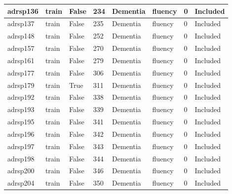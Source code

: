 \begin{center}
\begin{longtable}{|l|l|l|l|l|l|l|l|}
adrsp136       & train                 & False             & 234     & Dementia       & fluency         & 0            & Included      \\ \hline
adrsp137       & train                 & False             & 235     & Dementia       & fluency         & 0            & Included      \\ \hline
adrsp148       & train                 & False             & 252     & Dementia       & fluency         & 0            & Included      \\ \hline
adrsp157       & train                 & False             & 270     & Dementia       & fluency         & 0            & Included      \\ \hline
adrsp161       & train                 & False             & 279     & Dementia       & fluency         & 0            & Included      \\ \hline
adrsp177       & train                 & False             & 306     & Dementia       & fluency         & 0            & Included      \\ \hline
adrsp179       & train                 & True              & 311     & Dementia       & fluency         & 0            & Included      \\ \hline
adrsp192       & train                 & False             & 338     & Dementia       & fluency         & 0            & Included      \\ \hline
adrsp193       & train                 & False             & 339     & Dementia       & fluency         & 0            & Included      \\ \hline
adrsp195       & train                 & False             & 341     & Dementia       & fluency         & 0            & Included      \\ \hline
adrsp196       & train                 & False             & 342     & Dementia       & fluency         & 0            & Included      \\ \hline
adrsp197       & train                 & False             & 343     & Dementia       & fluency         & 0            & Included      \\ \hline
adrsp198       & train                 & False             & 344     & Dementia       & fluency         & 0            & Included      \\ \hline
adrsp200       & train                 & False             & 346     & Dementia       & fluency         & 0            & Included      \\ \hline
adrsp204       & train                 & False             & 350     & Dementia       & fluency         & 0            & Included      \\ \hline

\end{longtable}
\end{center}
